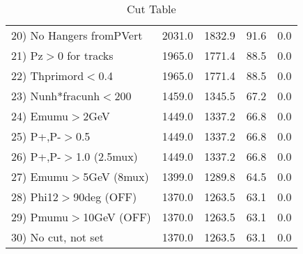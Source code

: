 \begin{table}[h!]
\begin{tabular}{||l||r|r|r|r||}
 20) No Hangers fromPVert &      2031.0 &      1832.9 &        91.6 &         0.0 \\
 21) Pz$>$0 for tracks    &      1965.0 &      1771.4 &        88.5 &         0.0 \\
 22) Thprimord$<$0.4      &      1965.0 &      1771.4 &        88.5 &         0.0 \\
 23) Nunh*fracunh$<$200   &      1459.0 &      1345.5 &        67.2 &         0.0 \\
 24) Emumu$>$2GeV         &      1449.0 &      1337.2 &        66.8 &         0.0 \\
 25) P+,P-$>$0.5          &      1449.0 &      1337.2 &        66.8 &         0.0 \\
 26) P+,P-$>$1.0 (2.5mux) &      1449.0 &      1337.2 &        66.8 &         0.0 \\
 27) Emumu$>$5GeV  (8mux) &      1399.0 &      1289.8 &        64.5 &         0.0 \\
 28) Phi12$>$90deg  (OFF) &      1370.0 &      1263.5 &        63.1 &         0.0 \\
 29) Pmumu$>$10GeV  (OFF) &      1370.0 &      1263.5 &        63.1 &         0.0 \\
 30) No cut, not set      &      1370.0 &      1263.5 &        63.1 &         0.0 \\
 \hline
 \hline
 \end{tabular}
 \caption{Cut Table \cohrp  }
 \label{tab-cut_crhop}
 \end{table}
